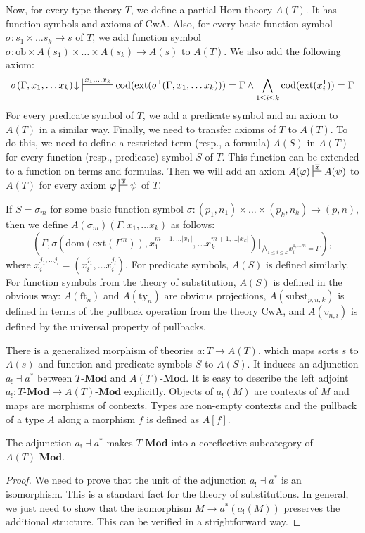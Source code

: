 \documentclass[reqno]{amsart}
\theoremstyle{definition}
\theoremstyle{remark}
\newcommand{\fs}[1]{\mathrm{#1}}
\newcommand{\Mod}[1]{#1\text{-}\mathbf{Mod}}
\numberwithin{figure}{section}
\begin{document}
Now, for every type theory $T$, we define a partial Horn theory $A(T)$.
It has function symbols and axioms of $\fs{CwA}$.
Also, for every basic function symbol $\sigma : s_1 \times \ldots s_k \to s$ of $T$, we add function symbol $\sigma : \fs{ob} \times A(s_1) \times \ldots \times A(s_k) \to A(s)$ to $A(T)$.
We also add the following axiom:
\[ \sigma(\Gamma, x_1, \ldots x_k)\!\downarrow\ \sststile{}{x_1, \ldots x_k} \fs{cod}(\fs{ext}(\sigma^1(\Gamma, x_1, \ldots x_k))) = \Gamma \land \bigwedge_{1 \leq i \leq k} \fs{cod}(\fs{ext}(x_i^1)) = \Gamma \]
For every predicate symbol of $T$, we add a predicate symbol and an axiom to $A(T)$ in a similar way.
Finally, we need to transfer axioms of $T$ to $A(T)$.
To do this, we need to define a restricted term (resp., a formula) $A(S)$ in $A(T)$ for every function (resp., predicate) symbol $S$ of $T$.
This function can be extended to a function on terms and formulas.
Then we will add an axiom $A(\varphi) \sststile{}{\overline{x}} A(\psi)$ to $A(T)$ for every axiom $\varphi \sststile{}{\overline{x}} \psi$ of $T$.

If $S = \sigma_m$ for some basic function symbol $\sigma : (p_1,n_1) \times \ldots \times (p_k,n_k) \to (p,n)$, then we define $A(\sigma_m)(\Gamma, x_1, \ldots x_k)$ as follows:
\[ (\Gamma, \sigma(\fs{dom}(\fs{ext}(\Gamma^m)), x_1^{m+1, \ldots |x_1|}, \ldots x_k^{m+1, \ldots |x_k|})|_{\bigwedge_{1 \leq i \leq k} x_i^{1, \ldots m} = \Gamma}), \]
where $x_i^{j_1, \ldots j_l} = (x_i^{j_1}, \ldots x_i^{j_l})$.
For predicate symbols, $A(S)$ is defined similarly.
For function symbols from the theory of substitution, $A(S)$ is defined in the obvious way: $A(\fs{ft}_n)$ and $A(\fs{ty}_n)$ are obvious projections,
$A(\fs{subst}_{p,n,k})$ is defined in terms of the pullback operation from the theory $\fs{CwA}$, and $A(v_{n,i})$ is defined by the universal property of pullbacks.

There is a generalized morphism of theories $a : T \to A(T)$, which maps sorts $s$ to $A(s)$ and function and predicate symbols $S$ to $A(S)$.
It induces an adjunction $a_! \dashv a^*$ between $\Mod{T}$ and $\Mod{A(T)}$.
It is easy to describe the left adjoint $a_! : \Mod{T} \to \Mod{A(T)}$ explicitly.
Objects of $a_!(M)$ are contexts of $M$ and maps are morphisms of contexts.
Types are non-empty contexts and the pullback of a type $A$ along a morphism $f$ is defined as $A[f]$.

\begin{prop}
The adjunction $a_! \dashv a^*$ makes $\Mod{T}$ into a coreflective subcategory of $\Mod{A(T)}$.
\end{prop}
\begin{proof}
We need to prove that the unit of the adjunction $a_! \dashv a^*$ is an isomorphism.
This is a standard fact for the theory of substitutions.
In general, we just need to show that the isomorphism $M \to a^*(a_!(M))$ preserves the additional structure.
This can be verified in a strightforward way.
\end{proof}
\end{document}
